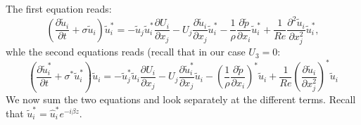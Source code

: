 The first equation reads:
%
\begin{equation}
\left( \frac{\partial \tilde{u}_i}{\partial t} + \sigma \tilde{u}_i \right) \tilde{u}^*_i =
- \tilde{u}_j \tilde{u}_i^* \frac{\partial U_i}{\partial x_j} - U_j \frac{\partial \tilde{u}_i}{\partial x_j} \tilde{u}_i^*
- \frac{1}{\rho} \frac{\partial \tilde{p}}{\partial x_i} \tilde{u}_i^* 
+ \frac{1}{Re} \frac{\partial^2 \tilde{u}_i}{\partial x_j^2} \tilde{u}_i^*,
\end{equation}
whle the second equations reads (recall that in our case $U_3=0$:
\begin{equation}
\left( \frac{\partial \tilde{u}_i^*}{\partial t} + \sigma^* \tilde{u}_i^* \right) \tilde{u}_i = 
- \tilde{u}_j^* \tilde{u}_i \frac{\partial U_i}{\partial x_j} - U_j \frac{\partial \tilde{u}_i^*}{\partial x_j} \tilde{u}_i
- \left( \frac{1}{\rho} \frac{\partial \tilde{p}}{\partial x_i} \right)^* \tilde{u}_i + 
\frac{1}{Re} \left( \frac{\partial \tilde{u}_i}{\partial x_j^2} \right)^* \tilde{u}_i
\end{equation}
%
We now sum the two equations and look separately at the different terms. Recall that $\tilde{u}_i^* = \hat{u}_i^* e^{-i\beta z}$.
